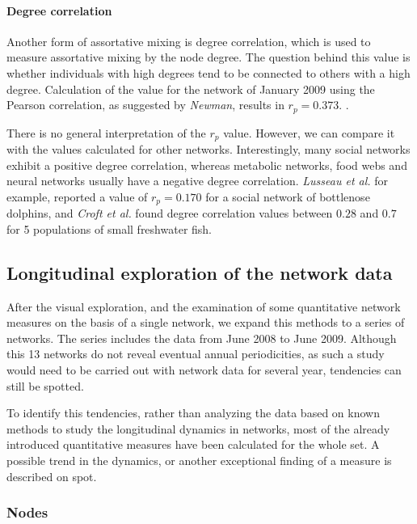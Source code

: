 \paragraph{Degree correlation}
\label{para:degree_corr}
 
Another form of assortative mixing is degree correlation, which is used to measure assortative mixing by the node degree. The question behind this value is whether individuals with high degrees tend to be connected to others with a high degree\citep{croft:07}. Calculation of the value for the network of January 2009 using the Pearson correlation, as suggested by \textit{Newman}\citep{newman:02}, results in $r_p = 0.373$. \citep{newman:03a}. 

There is no general interpretation of the $r_p$ value. However, we can compare it with the values calculated for other networks. Interestingly, many social networks exhibit a positive degree correlation, whereas metabolic networks, food webs and neural networks usually have a negative degree correlation\citep{newman:03a}. \textit{Lusseau et al.}\citep{lusseau:06} for example, reported a value of $r_p = 0.170$ for a social network of bottlenose dolphins, and \textit{Croft et al.}\citep{croft:05} found degree correlation values between $0.28$ and $0.7$ for 5 populations of small freshwater fish.   
 
\subsection{Longitudinal exploration of the network data}
\label{subsec:longitudinal}

After the visual exploration, and the examination of some quantitative network measures on the basis of a single network, we expand this methods to a series of networks. The series includes the data from June 2008 to June 2009. Although this 13 networks do not reveal eventual annual periodicities, as such a study would need to be carried out with network data for several year, tendencies can still be spotted.
 
To identify this tendencies, rather than analyzing the data based on known methods to study the longitudinal dynamics in networks\citep{snijders:05}, most of the already introduced quantitative measures have been calculated for the whole set. A possible trend in the dynamics, or another exceptional finding of a measure is described on spot.

\subsubsection{Nodes}

